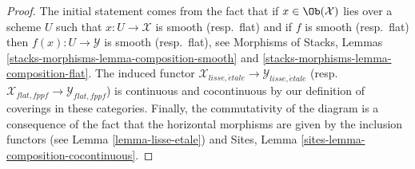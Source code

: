 \begin{proof}
The initial statement comes from the fact that if $x \in \Ob(\mathcal{X})$
lies over a scheme $U$ such that $x : U \to \mathcal{X}$ is smooth
(resp.\ flat) and if $f$ is smooth (resp.\ flat) then
$f(x) : U \to \mathcal{Y}$ is smooth (resp.\ flat), see
Morphisms of Stacks, Lemmas \ref{stacks-morphisms-lemma-composition-smooth} and
\ref{stacks-morphisms-lemma-composition-flat}. The induced functor
$\mathcal{X}_{lisse,\acute{e}tale} \to \mathcal{Y}_{lisse,\acute{e}tale}$
(resp.\ $\mathcal{X}_{flat,fppf} \to \mathcal{Y}_{flat,fppf}$) is
continuous and cocontinuous by our definition of coverings in these
categories. Finally, the commutativity of the diagram is a consequence of the
fact that the horizontal morphisms are given by the inclusion functors (see
Lemma \ref{lemma-lisse-etale}) and
Sites, Lemma \ref{sites-lemma-composition-cocontinuous}.


\end{proof}

